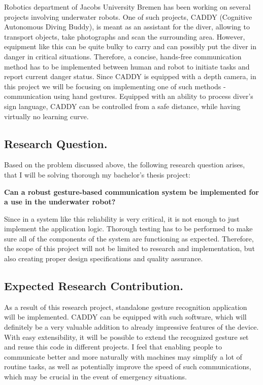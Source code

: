 \documentclass[a4paper,11pt,oneside]{article}
\begin{document}
Robotics department of Jacobs University Bremen has been working on several projects involving underwater robots. One of such projects, CADDY (Cognitive Autonomous Diving Buddy), is meant as an assistant for the diver, allowing to transport objects, take photographs and scan the surrounding area. However, equipment like this can be quite bulky to carry and can possibly put the diver in danger in critical situations. Therefore, a concise, hands-free communication method has to be implemented between human and robot to initiate tasks and report current danger status. Since CADDY is equipped with a depth camera, in this project we will be focusing on implementing one of such methods - communication using hand gestures. Equipped with an ability to process diver's sign language, CADDY can be controlled from a safe distance, while having virtually no learning curve. 

\subsection{Research Question.}

Based on the problem discussed above, the following research question arises, that I will be solving thorough my bachelor's thesis project:

\textbf{Can a robust gesture-based communication system be implemented for a use in the underwater robot?}

Since in a system like this reliability is very critical, it is not enough to just implement the application logic. Thorough testing has to be performed to make sure all of the components of the system are functioning as expected. Therefore, the scope of this project will not be limited to research and implementation, but also creating proper design specifications and quality assurance.

\subsection{Expected Research Contribution.}

As a result of this research project, standalone gesture recognition application will be implemented. CADDY can be equipped with such software, which will definitely be a very valuable addition to already impressive features of the device. With easy extensibility, it will be possible to extend the recognized gesture set and reuse this code in different projects. I feel that enabling people to communicate better and more naturally with machines may simplify a lot of routine tasks, as well as potentially improve the speed of such communications, which may be crucial in the event of emergency situations.
\end{document}
